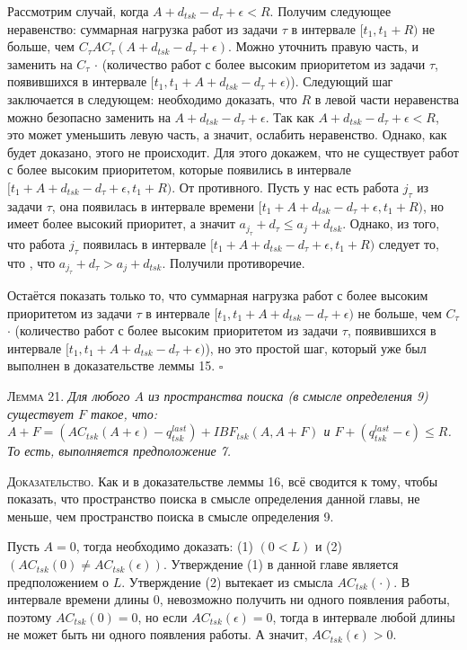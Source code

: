 \documentclass[14pt]{matmex-diploma-custom}
\begin{document}
  Рассмотрим случай, когда $A + d_{tsk} - d_{\tau} + \epsilon < R$. Получим следующее неравенство: 
    суммарная нагрузка работ из задачи $\tau$ в интервале $[t_1, t_1 + R)$
      не больше, чем $C_{\tau}AC_{\tau}(A + d_{tsk} - d_{\tau} + \epsilon)$.
    Можно уточнить правую часть, и заменить на 
      $C_{\tau}$ $\cdot$ (количество работ с более высоким приоритетом из задачи $\tau$, 
        появившихся в интервале $[t_1, t_1 + A + d_{tsk} - d_{\tau} + \epsilon)$).
  Следующий шаг заключается в следующем: необходимо доказать, что $R$ в левой части неравенства 
    можно безопасно заменить на $A + d_{tsk} - d_{\tau} + \epsilon$. Так как $A + d_{tsk} - d_{\tau} + \epsilon < R$,
    это может уменьшить левую часть, а значит, ослабить неравенство. Однако, как будет доказано, 
    этого не происходит. 
  Для этого докажем, что не существует работ с более высоким приоритетом, которые появились 
    в интервале $[t_1 + A + d_{tsk} - d_{\tau} + \epsilon, t_1 + R)$.
  От противного. Пусть у нас есть работа $j_{\tau}$ из задачи $\tau$, она появилась 
    в интервале времени $[t_1 + A + d_{tsk} - d_{\tau} + \epsilon, t_1 + R)$, но 
    имеет более высокий приоритет, а значит $a_{j_{\tau}} + d_{\tau} \leq a_{j} + d_{tsk}$.
  Однако, из того, что работа $j_{\tau}$ появилась в интервале $[t_1 + A + d_{tsk} - d_{\tau} + \epsilon, t_1 + R)$ 
    следует то, что , что $a_{j_{\tau}} + d_{\tau} > a_{j} + d_{tsk}$. Получили противоречие.
  
  Остаётся показать только то, что суммарная нагрузка работ с более высоким приоритетом 
    из задачи $\tau$ в интервале $[t_1, t_1 + A + d_{tsk} - d_{\tau} + \epsilon)$ не больше, чем 
    $C_{\tau}$ $\cdot$ (количество работ с более высоким приоритетом из задачи $\tau$, 
        появившихся в интервале $[t_1, t_1 + A + d_{tsk} - d_{\tau} + \epsilon)$), 
    но это простой шаг, который уже был выполнен в доказательстве леммы 15.
$\square$


\textsc{Лемма 21.}
\textit{Для любого $A$ из пространства поиска (в смысле определения 9)
  существует $F$ такое, что: 
    $A + F = (AC_{tsk}(A + \epsilon) - q_{tsk}^{last}) + IBF_{tsk}(A, A + F)$ 
    и $F + (q_{tsk}^{last} - \epsilon) \leq R$. 
  То есть, выполняется предположение 7. }

\textsc{Доказательство.}  
  Как и в доказательстве леммы 16, всё сводится к тому, чтобы показать, 
    что пространство поиска в смысле определения данной главы, не меньше, 
    чем пространство поиска в смысле определения 9.

  Пусть $A = 0$, тогда необходимо доказать: 
    (1) $(0 < L)$ и (2) $(AC_{tsk}(0) \neq AC_{tsk}(\epsilon))$. 
  Утверждение (1) в данной главе является предположением о $L$.
  Утверждение (2) вытекает из смысла $AC_{tsk}(\cdot)$. В интервале времени длины 0,
    невозможно получить ни одного появления работы, поэтому $AC_{tsk}(0) = 0$, 
    но если $AC_{tsk}(\epsilon) = 0$, тогда в интервале любой длины не может 
    быть ни одного появления работы. А значит, $AC_{tsk}(\epsilon) > 0$.
\end{document}
